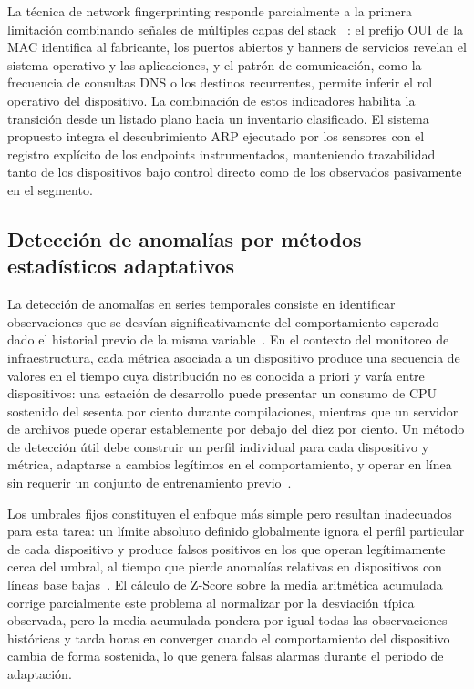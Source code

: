 La técnica de network fingerprinting responde parcialmente a la 
primera limitación combinando señales de múltiples capas del stack 
~\cite{lippmann2003fingerprint}: el prefijo OUI de la MAC identifica 
al fabricante, los puertos abiertos y banners de servicios revelan 
el sistema operativo y las aplicaciones, y el patrón de 
comunicación, como la frecuencia de consultas DNS o los destinos 
recurrentes, permite inferir el rol operativo del dispositivo. La 
combinación de estos indicadores habilita la transición desde un 
listado plano hacia un inventario clasificado. El sistema propuesto 
integra el descubrimiento ARP ejecutado por los sensores con el 
registro explícito de los endpoints instrumentados, manteniendo 
trazabilidad tanto de los dispositivos bajo control directo como de 
los observados pasivamente en el segmento.

\subsection{Detección de anomalías por métodos estadísticos adaptativos}

La detección de anomalías en series temporales consiste en 
identificar observaciones que se desvían significativamente del 
comportamiento esperado dado el historial previo de la misma 
variable~\cite{chandola2009anomaly}. En el contexto del monitoreo 
de infraestructura, cada métrica asociada a un dispositivo produce 
una secuencia de valores en el tiempo cuya distribución no es 
conocida a priori y varía entre dispositivos: una estación de 
desarrollo puede presentar un consumo de CPU sostenido del sesenta 
por ciento durante compilaciones, mientras que un servidor de 
archivos puede operar establemente por debajo del diez por ciento. 
Un método de detección útil debe construir un perfil individual 
para cada dispositivo y métrica, adaptarse a cambios legítimos en 
el comportamiento, y operar en línea sin requerir un conjunto de 
entrenamiento previo~\cite{chandola2009anomaly}.

Los umbrales fijos constituyen el enfoque más simple pero resultan 
inadecuados para esta tarea: un límite absoluto definido globalmente 
ignora el perfil particular de cada dispositivo y produce falsos 
positivos en los que operan legítimamente cerca del umbral, al 
tiempo que pierde anomalías relativas en dispositivos con líneas 
base bajas~\cite{montgomery2013spc}. El cálculo de Z-Score sobre la 
media aritmética acumulada corrige parcialmente este problema al 
normalizar por la desviación típica observada, pero la media 
acumulada pondera por igual todas las observaciones históricas y 
tarda horas en converger cuando el comportamiento del dispositivo 
cambia de forma sostenida, lo que genera falsas alarmas durante el 
periodo de adaptación.


